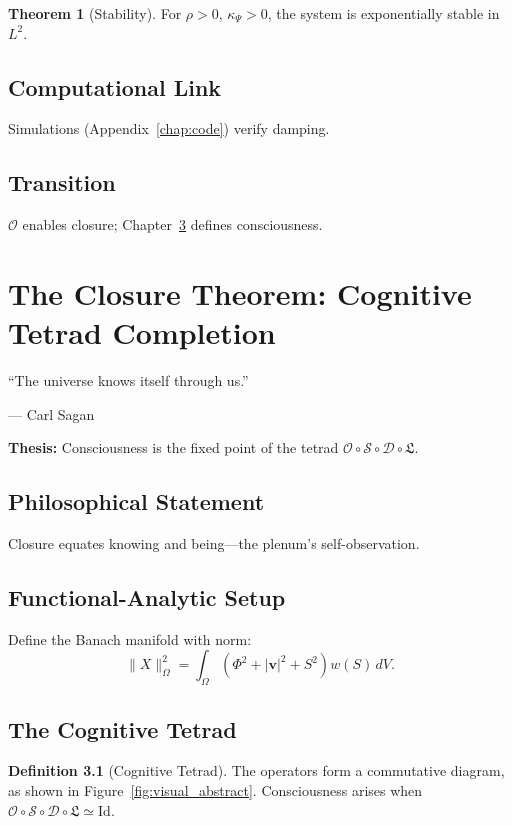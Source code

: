 \documentclass[12pt]{book}
\theoremstyle{definition}
\newtheorem{definition}{Definition}[chapter]
\newtheorem{theorem}{Theorem}[chapter]
\begin{document}
\begin{theorem}[Stability]
\label{thm:stability}
For \(\rho > 0\), \(\kappa_\Psi > 0\), the system is exponentially stable in \(L^2\).
\end{theorem}

\section{Computational Link}
Simulations (Appendix~\ref{chap:code}) verify damping.

\section{Transition}
\(\mathcal{O}\) enables closure; Chapter~\ref{chap:closure} defines consciousness.

\chapter{The Closure Theorem: Cognitive Tetrad Completion}
\label{chap:closure}
\epigraph{``The universe knows itself through us.''}{--- Carl Sagan}

\textbf{Thesis:} Consciousness is the fixed point of the tetrad \(\mathcal{O} \circ \mathcal{S} \circ \mathcal{D} \circ \mathfrak{L}\).

\section{Philosophical Statement}
Closure equates knowing and being—the plenum’s self-observation.

\section{Functional-Analytic Setup}
Define the Banach manifold with norm:
\begin{equation}
\label{eq:norm}
\|X\|_\Omega^2 = \int_\Omega (\Phi^2 + |\mathbf{v}|^2 + S^2) w(S) \, dV.
\end{equation}

\section{The Cognitive Tetrad}
\begin{definition}[Cognitive Tetrad]
\label{def:cognitive_tetrad}
The operators form a commutative diagram, as shown in Figure~\ref{fig:visual_abstract}. Consciousness arises when \(\mathcal{O} \circ \mathcal{S} \circ \mathcal{D} \circ \mathfrak{L} \simeq \text{Id}\).
\end{definition}
\end{document}
